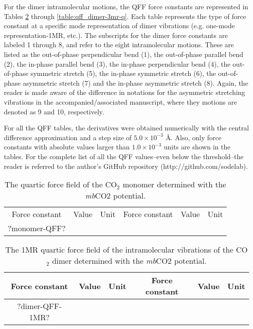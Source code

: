 \documentclass[aip,jcp,showpacs,superscriptaddress,groupedaddress]{revtex4-1}  %
\begin{document}
For the dimer intramolecular motions, the QFF force constants are represented in Tables \ref{table:qff_dimer-1mr} through \ref{table:qff_dimer-3mr-q}. Each table represents the type of force constant at a specific mode representation of dimer vibrations (e.g. one-mode representation-1MR, etc.). The subscripts for the dimer force constants are labeled 1 through 8, and refer to the eight intramolecular motions. These are listed as the out-of-phase perpendicular bend (1), the out-of-phase parallel bend (2), the in-phase parallel bend (3), the in-phase perpendicular bend (4), the out-of-phase symmetric stretch (5), the in-phase symmetric stretch (6), the out-of-phase asymmetric stretch (7) and the in-phase asymmetric stretch (8). Again, the reader is made aware of the difference in notations for the asymmetric stretching vibrations in the accompanied/associated manuscript, where they motions are denoted as 9 and 10, respectively. 

For all the QFF tables, the derivatives were obtained numerically with the central difference approximation and a step size of $5.0 \times10^{-3}$ \AA.  Also, only force constants with absolute values larger than $1.0\times10^{-3}$ units are shown in the tables. For the complete list of all the QFF values--even below the threshold--the reader is referred to the author's GitHub repository (http://github.com/sodelab).


\begin{table}[]
\centering
\caption{The quartic force field of the CO$_2$ monomer determined with the \emph{mb}CO2 potential.}
\label{table:qff_monomer}
\begin{ruledtabular}
\begin{tabular}{cccccc}
Force constant & Value        & Unit  & Force constant & Value        & Unit     \\
 ?monomer-QFF?
\end{tabular}
\end{ruledtabular}
\end{table}


\begin{table}[]
\centering
\caption{The 1MR quartic force field of the intramolecular vibrations of the CO$_2$ dimer determined with the \emph{mb}CO2 potential.}
\label{table:qff_dimer-1mr}
\begin{ruledtabular}
\begin{tabular}{cccccc}
Force constant & Value        & Unit  & Force constant & Value        & Unit     \\
\hline \Tstrut
?dimer-QFF-1MR?
\end{tabular}
\end{ruledtabular}
\end{table}
\end{document}

